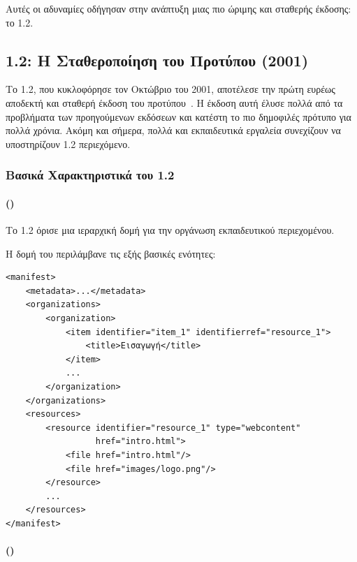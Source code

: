 Αυτές οι αδυναμίες οδήγησαν στην ανάπτυξη μιας πιο ώριμης και σταθερής έκδοσης: το  1.2.

\subsection{ 1.2: Η Σταθεροποίηση του Προτύπου (2001)}
\label{subsec:scorm_12}

Το  1.2, που κυκλοφόρησε τον Οκτώβριο του 2001, αποτέλεσε την πρώτη ευρέως αποδεκτή και σταθερή έκδοση του προτύπου~\cite{scormcom2024scorm12overview,adl2002cookbook}. Η έκδοση αυτή έλυσε πολλά από τα προβλήματα των προηγούμενων εκδόσεων και κατέστη το πιο δημοφιλές  πρότυπο για πολλά χρόνια. Ακόμη και σήμερα, πολλά  και εκπαιδευτικά εργαλεία συνεχίζουν να υποστηρίζουν  1.2 περιεχόμενο.

\subsubsection{Βασικά Χαρακτηριστικά του  1.2}

\paragraph{   ()}

Το  1.2  όρισε μια ιεραρχική δομή για την οργάνωση εκπαιδευτικού περιεχομένου.



Η δομή του \texttt{} περιλάμβανε τις εξής βασικές ενότητες:

{\selectfont

\begin{verbatim}
<manifest>
    <metadata>...</metadata>
    <organizations>
        <organization>
            <item identifier="item_1" identifierref="resource_1">
                <title>Εισαγωγή</title>
            </item>
            ...
        </organization>
    </organizations>
    <resources>
        <resource identifier="resource_1" type="webcontent" 
                  href="intro.html">
            <file href="intro.html"/>
            <file href="images/logo.png"/>
        </resource>
        ...
    </resources>
</manifest>
\end{verbatim}
}
\paragraph{  ()}

